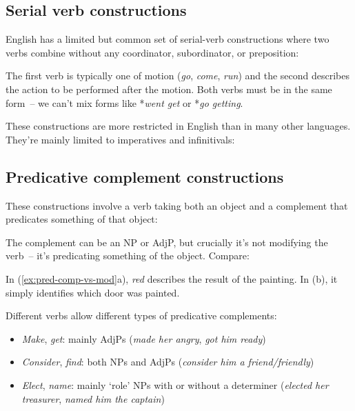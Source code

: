 \subsection{Serial verb constructions} 

English has a limited but common set of serial-verb constructions where two verbs combine without any coordinator, subordinator, or preposition:

\ea\label{ex:serial}
   \z
\z

The first verb is typically one of motion (\textit{go}, \textit{come}, \textit{run}) and the second describes the action to be performed after the motion. Both verbs must be in the same form~-- we can't mix forms like *\textit{went get} or *\textit{go getting}.

These constructions are more restricted in English than in many other languages. They're mainly limited to imperatives and infinitivals:

\ea\label{ex:serial-forms}
   \z
\z

\subsection{Predicative complement constructions}

These constructions involve a verb taking both an object and a complement that predicates something of that object:

\ea\label{ex:pred-comp}
   \z
\z

The complement can be an NP or AdjP, but crucially it's not modifying the verb~-- it's predicating something of the object. Compare:

\ea\label{ex:pred-comp-vs-mod}
   \z
\z

In (\ref{ex:pred-comp-vs-mod}a), \textit{red} describes the result of the painting. In (b), it simply identifies which door was painted.

Different verbs allow different types of predicative complements:
\begin{itemize}[noitemsep]
   \item \textit{Make}, \textit{get}: mainly AdjPs (\textit{made her angry}, \textit{got him ready})
   \item \textit{Consider}, \textit{find}: both NPs and AdjPs (\textit{consider him a friend/friendly})
   \item \textit{Elect}, \textit{name}: mainly `role' NPs with or without a determiner (\textit{elected her treasurer}, \textit{named him the captain})
\end{itemize}

